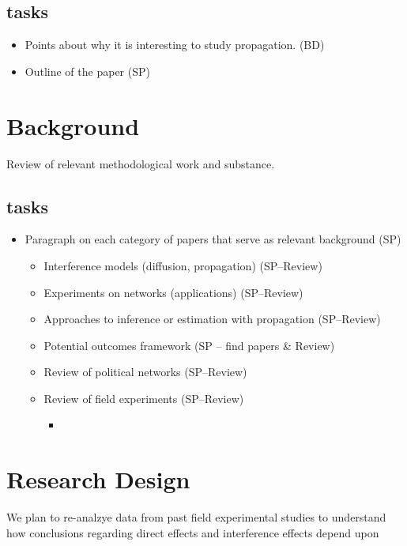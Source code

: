 \documentclass[12pt]{article}
\begin{document}
\subsection{tasks}
\begin{itemize}
\item Points about why it is interesting to study propagation. (BD)
\item Outline of the paper (SP)
\end{itemize}

\section{Background}

Review of relevant methodological work and substance.

\subsection{tasks}
\begin{itemize}
\item Paragraph on each category of papers that serve as relevant background (SP)
\begin{itemize}
\item Interference models (diffusion, propagation) (SP--Review)
\item  Experiments on networks (applications) (SP--Review)
\item Approaches to inference or estimation with propagation (SP--Review) 
\item Potential outcomes framework (SP -- find papers \& Review)
\item Review of political networks (SP--Review)
\item Review of field experiments (SP--Review)
\begin{itemize}
\item \citep{Gottlieb:2015,Alatas:2012,Kalla:2015, Malesky:2012,Ichino:2012,Nyhan:2014}
\end{itemize}
\end{itemize}
\end{itemize}


\section{Research Design}

We plan to re-analzye data from past field experimental studies to understand how conclusions regarding direct effects and interference effects depend upon 
\end{document}

